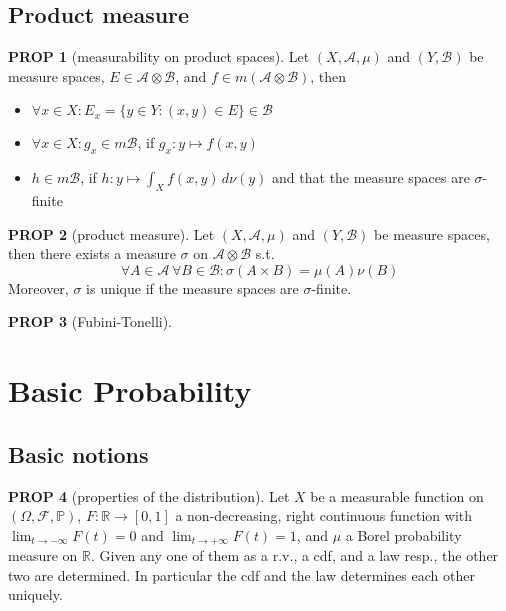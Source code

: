 \documentclass[hidelinks,11pt]{article}
\theoremstyle{definition}
\theoremstyle{dotles}
\theoremstyle{dotless}
\newtheorem{prop}{PROP}[section]
\theoremstyle{remark}
\begin{document}
\subsection{Product measure}

\begin{prop}[measurability on product spaces]\label{Prop 1.9}
Let $(X,\mathcal{A},\mu)$ and $(Y,\mathcal{B})$ be measure spaces, $E\in\mathcal{A}\otimes\mathcal{B}$, and $f\in m(\mathcal{A}\otimes\mathcal{B})$, then\begin{itemize}
    \item $\forall x\in X:E_x=\{y\in Y:(x,y)\in E\}\in\mathcal{B}$
    \item $\forall x\in X:g_x\in m\mathcal{B}$, if $g_x:y\mapsto f(x,y)$
    \item $h\in m\mathcal{B}$, if $h:y\mapsto\int_Xf(x,y)\,d\nu(y)$ and that the measure spaces are $\sigma$-finite
\end{itemize}
\end{prop}

\begin{prop}[product measure]\label{Prop 1.10}
Let $(X,\mathcal{A},\mu)$ and $(Y,\mathcal{B})$ be measure spaces, then there exists a measure $\sigma$ on $\mathcal{A}\otimes\mathcal{B}$ s.t.
\[\forall A\in\mathcal{A}\,\forall B\in\mathcal{B}:\sigma(A\times B)=\mu(A)\nu(B)\]
Moreover, $\sigma$ is unique if the measure spaces are $\sigma$-finite.
\end{prop}

\begin{prop}[Fubini-Tonelli]

\end{prop}

\section{Basic Probability}

\subsection{Basic notions}

\begin{prop}[properties of the distribution]\label{Prop 2.1}
Let $X$ be a measurable function on $(\Omega,\mathcal{F},\mathbb{P})$, $F:\mathbb{R}\to[0,1]$ a non-decreasing, right continuous function with $\lim_{t\to-\infty}F(t)=0$ and $\lim_{t\to+\infty}F(t)=1$, and $\mu$ a Borel probability measure on $\mathbb{R}$. Given any one of them as a r.v., a cdf, and a law resp., the other two are determined. In particular the cdf and the law determines each other uniquely.
\end{prop}
\end{document}
